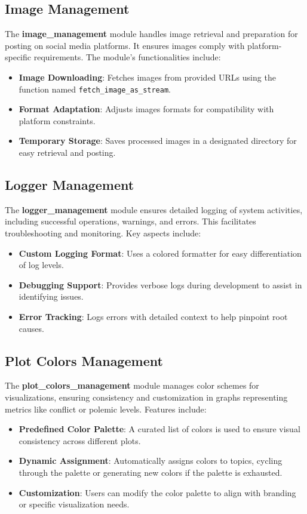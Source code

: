 \subsection{Image Management}
\label{subsec:image_management}
The \textbf{image\_management} module handles image retrieval and preparation for posting on social media platforms. It ensures images comply with platform-specific requirements. The module’s functionalities include:
\begin{itemize}
    \item \textbf{Image Downloading}: Fetches images from provided URLs using the function named \texttt{fetch\_image\_as\_stream}.
    \item \textbf{Format Adaptation}: Adjusts images formats for compatibility with platform constraints.
    \item \textbf{Temporary Storage}: Saves processed images in a designated directory for easy retrieval and posting.
\end{itemize}

\subsection{Logger Management}
\label{subsec:logger_management}
The \textbf{logger\_management} module ensures detailed logging of system activities, including successful operations, warnings, and errors. This facilitates troubleshooting and monitoring. Key aspects include:
\begin{itemize}
    \item \textbf{Custom Logging Format}: Uses a colored formatter for easy differentiation of log levels.
    \item \textbf{Debugging Support}: Provides verbose logs during development to assist in identifying issues.
    \item \textbf{Error Tracking}: Logs errors with detailed context to help pinpoint root causes.
\end{itemize}

\subsection{Plot Colors Management}
\label{subsec:plot_colors_management}
The \textbf{plot\_colors\_management} module manages color schemes for visualizations, ensuring consistency and customization in graphs representing metrics like conflict or polemic levels. Features include:
\begin{itemize}
    \item \textbf{Predefined Color Palette}: A curated list of colors is used to ensure visual consistency across different plots.
    \item \textbf{Dynamic Assignment}: Automatically assigns colors to topics, cycling through the palette or generating new colors if the palette is exhausted.
    \item \textbf{Customization}: Users can modify the color palette to align with branding or specific visualization needs.
\end{itemize}

